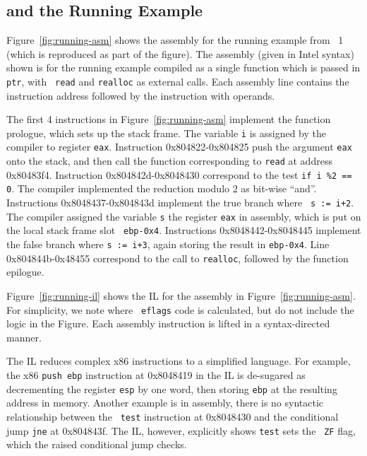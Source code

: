\subsection{\bap and the Running Example}


%

Figure~\ref{fig:running-asm} shows the assembly for the running
example from \chref~1 (which is reproduced as part of the figure). The
assembly (given in Intel syntax) shown is for the running example
compiled as a single function which is passed in {\tt ptr}, with {\tt
read} and {\tt realloc} as external calls.  Each assembly line
contains the instruction address followed by the instruction with
operands.

The first 4 instructions in Figure~\ref{fig:running-asm} implement the
function prologue, which sets up the stack frame.  The variable {\tt i}
is assigned by the compiler to register {\tt eax}. Instruction
0x804822-0x804825 push the argument {\tt eax} onto the stack, and then
call the function corresponding to {\tt read} at address 0x80483f4.
Instruction 0x804842d-0x8048430 correspond to the test {\tt if i \%2
== 0}.  The compiler implemented the reduction modulo 2 as bit-wise ``and''.
Instructions 0x8048437-0x804843d implement the true branch where {\tt
s := i+2}.  The compiler assigned the variable {\tt s} the register
{\tt eax} in assembly, which is put on the local stack frame slot {\tt
ebp-0x4}.  Instructions 0x8048442-0x8048445 implement the false branch
where {\tt s := i+3}, again storing the result in {\tt ebp-0x4}.  Line
0x804844b-0x48455 correspond to the call to {\tt realloc}, followed by
the function epilogue.



Figure~\ref{fig:running-il} shows the \bap IL for the assembly in
Figure~\ref{fig:running-asm}. For simplicity, we note where {\tt
eflags} code is calculated, but do not include the logic in the
Figure. Each assembly instruction is lifted in a syntax-directed
manner.

The IL reduces complex x86 instructions to a simplified language. For
example, the x86 {\tt push ebp} instruction at 0x8048419 in the IL is
de-sugared as decrementing the register {\tt esp} by one word, then
storing {\tt ebp} at the resulting address in memory.  Another example
is in assembly, there is no syntactic relationship between the {\tt
test} instruction at 0x8048430 and the conditional jump {\tt jne} at
0x804843f. The IL, however, explicitly shows {\tt test} sets the {\tt
 ZF} flag, which the raised conditional jump checks.


